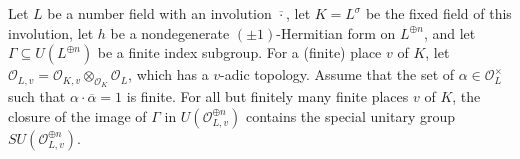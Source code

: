 \begin{proposition} \label{proposition:ell_adic_image_of_arithmetic_group_contains_SU}
    Let $L$ be a number field with an involution $\overline{\cdot}$, let $K = L^{\sigma}$ be the fixed field of this involution, let $h$ be a nondegenerate $(\pm 1)$-Hermitian form on $L^{\oplus n}$, and let $\Gamma \subseteq U(L^{\oplus n})$ be a finite index subgroup. For a (finite) place $v$ of $K$, let $\mathcal{O}_{L,v} = \mathcal{O}_{K,v} \otimes_{\mathcal{O}_K} \mathcal{O}_L$, which has a $v$-adic topology. Assume that the set of $\alpha \in \mathcal{O}_L^\times$ such that $\alpha \cdot \overline{\alpha} = 1$ is finite. For all but finitely many finite places $v$ of $K$, the closure of the image of $\Gamma$ in $U(\mathcal{O}_{L,v}^{\oplus n})$ contains the special unitary group $SU(\mathcal{O}_{L,v}^{\oplus n})$.
\end{proposition}